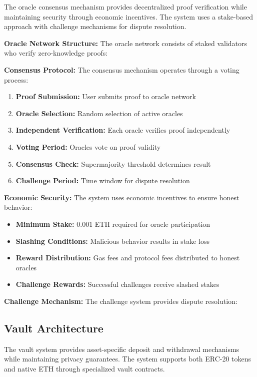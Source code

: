 \documentclass[11pt,a4paper]{article}
\begin{document}
The oracle consensus mechanism provides decentralized proof verification while maintaining security through economic incentives. The system uses a stake-based approach with challenge mechanisms for dispute resolution.

\textbf{Oracle Network Structure:}
The oracle network consists of staked validators who verify zero-knowledge proofs:


\textbf{Consensus Protocol:}
The consensus mechanism operates through a voting process:

\begin{enumerate}
    \item \textbf{Proof Submission:} User submits proof to oracle network
    \item \textbf{Oracle Selection:} Random selection of active oracles
    \item \textbf{Independent Verification:} Each oracle verifies proof independently
    \item \textbf{Voting Period:} Oracles vote on proof validity
    \item \textbf{Consensus Check:} Supermajority threshold determines result
    \item \textbf{Challenge Period:} Time window for dispute resolution
\end{enumerate}

\textbf{Economic Security:}
The system uses economic incentives to ensure honest behavior:

\begin{itemize}
    \item \textbf{Minimum Stake:} 0.001 ETH required for oracle participation
    \item \textbf{Slashing Conditions:} Malicious behavior results in stake loss
    \item \textbf{Reward Distribution:} Gas fees and protocol fees distributed to honest oracles
    \item \textbf{Challenge Rewards:} Successful challenges receive slashed stakes
\end{itemize}

\textbf{Challenge Mechanism:}
The challenge system provides dispute resolution:


\subsection{Vault Architecture}

The vault system provides asset-specific deposit and withdrawal mechanisms while maintaining privacy guarantees. The system supports both ERC-20 tokens and native ETH through specialized vault contracts.
\end{document}
